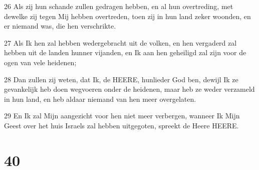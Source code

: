 \par 26 Als zij hun schande zullen gedragen hebben, en al hun overtreding, met dewelke zij tegen Mij hebben overtreden, toen zij in hun land zeker woonden, en er niemand was, die hen verschrikte.
\par 27 Als Ik hen zal hebben wedergebracht uit de volken, en hen vergaderd zal hebben uit de landen hunner vijanden, en Ik aan hen geheiligd zal zijn voor de ogen van vele heidenen;
\par 28 Dan zullen zij weten, dat Ik, de HEERE, hunlieder God ben, dewijl Ik ze gevankelijk heb doen wegvoeren onder de heidenen, maar heb ze weder verzameld in hun land, en heb aldaar niemand van hen meer overgelaten.
\par 29 En Ik zal Mijn aangezicht voor hen niet meer verbergen, wanneer Ik Mijn Geest over het huis Israels zal hebben uitgegoten, spreekt de Heere HEERE.

\chapter{40}

